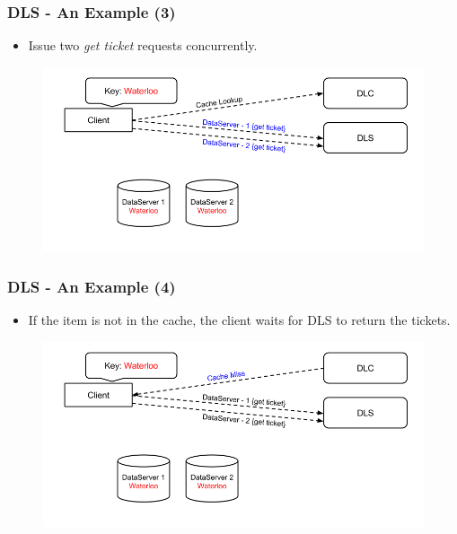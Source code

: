 \documentclass{beamer}
\begin{document}
\begin{frame}
  \frametitle{DLS - An Example (3)}
  \begin{itemize}
  \item Issue two \textit{get ticket} requests concurrently.
\newline
  \end{itemize}
  \begin{figure}
    \begin{center}
      \centerline{\includegraphics[scale=0.40]{img/DLS_Example03.png}}
    \end{center}
  \end{figure}
\end{frame}

\begin{frame}
  \frametitle{DLS - An Example (4)}
  \begin{itemize}
  \item If the item is not in the cache, the client waits for DLS to
    return the tickets.
  \end{itemize}
  \begin{figure}
    \begin{center}
      \centerline{\includegraphics[scale=0.40]{img/DLS_Example04.png}}
    \end{center}
  \end{figure}
\end{frame}
\end{document}
